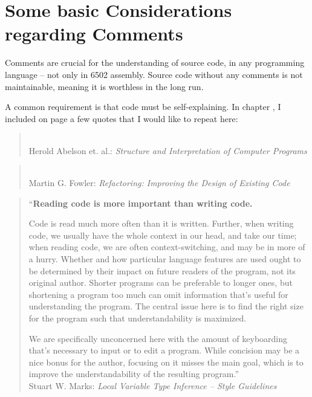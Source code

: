 \chapter{Some basic Considerations regarding Comments}
Comments are crucial for the understanding of source code, in any programming language – not only in 6502 assembly. Source code without any comments is not maintainable, meaning it is worthless in the long run.

A common requirement is that code must be self-explaining. In chapter , I included on page \pageref{par:ReadableCode} a few quotes that I would like to repeat here:

\begin{quote}
	\\
	Herold Abelson et. al.: \textit{Structure and Interpretation of Computer Programs} \autocite{Sussman:StructureAndInterpretationOfComputerPrograms}
\end{quote}

\begin{quote}
	 \\
	Martin G. Fowler: \textit{Refactoring: Improving the Design of Existing Code} \autocite{Fowler:Refactoring}
\end{quote}

\begin{quote}
	``\textbf{Reading code is more important than writing code.}
	
	Code is read much more often than it is written. Further, when writing code, we usually have the whole context in our head, and take our time; when reading code, we are often context-switching, and may be in more of a hurry. Whether and how particular language features are used ought to be determined by their impact on future readers of the program, not its original author. Shorter programs can be preferable to longer ones, but shortening a program too much can omit information that's useful for understanding the program. The central issue here is to find the right size for the program such that understandability is maximized.

We are specifically unconcerned here with the amount of keyboarding that’s necessary to input or to edit a program. While concision may be a nice bonus for the author, focusing on it misses the main goal, which is to improve the understandability of the resulting program.'' \\
	Stuart W. Marks: \textit{Local Variable Type Inference – Style Guidelines} \autocite{Marks:LocalVariableTypeInference:ReadingIsMoreImportantThanWriting}
\end{quote}

